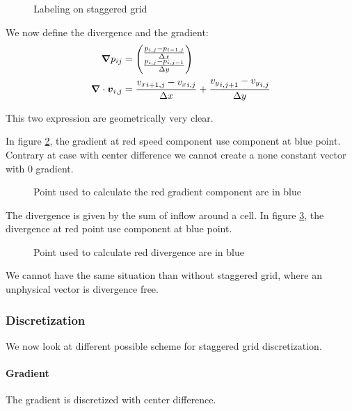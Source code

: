\begin{figure}
\caption{Labeling on staggered grid}
\label{fixed:staggered_label}
\end{figure}

We now define the divergence and the gradient:
\begin{align}
  {\boldsymbol {\nabla}}p_{ij}&=\begin{pmatrix}
    \frac{p_{i,j}-p_{i-1,j}}{\Delta x}\\
    \frac{p_{i,j}-p_{i,j-1}}{\Delta y}\\
                      \end{pmatrix}\\
  {\boldsymbol {\nabla}}\cdot {\boldsymbol {v}}_{i,j}&=\frac{{v_{x}}_{i+1,j}-{v_{x}}_{i,j}}{\Delta x}+\frac{{v_{y}}_{i,j+1}-{v_{y}}_{i,j}}{\Delta y}
\end{align}

This two expression are geometrically very clear.

In figure \ref{fixed:staggered_gradient}, the gradient at red speed component use component at blue point.
Contrary at case with center difference we cannot create a none constant vector with 0 gradient.

\begin{figure}
\caption{Point used to calculate the red gradient component are in blue}
\label{fixed:staggered_gradient}
\end{figure}

The divergence is given by the sum of inflow around a cell.
In figure \ref{fixed:staggered_divergence}, the divergence at red point use component at blue point.

\begin{figure}
\caption{Point used to calculate red divergence are in blue}
\label{fixed:staggered_divergence}
\end{figure}

We cannot have the same situation than without staggered grid, where an unphysical vector is divergence free.

\subsubsection{Discretization}

We now look at different possible scheme for staggered grid discretization.

\paragraph{Gradient}
The gradient is discretized with center difference.

